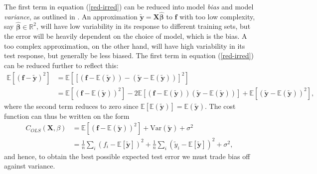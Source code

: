 \documentclass[]{article}
\begin{document}
The first term in equation (\ref{red-irred}) can be reduced into model \textit{bias} and model \textit{variance}, as outlined in \cite{friedman2001elements}. An approximation $\mathbf{\tilde{y}} = \mathbf{X\hat{\beta}}$ to $\mathbf{f}$ with too low complexity, say $\mathbf{\hat{\beta}} \in \mathbb{R}^2$, will have low variability in its response to different training sets, but the error will be heavily dependent on the choice of model, which is the bias. A too complex approximation, on the other hand, will have high variability in its test response, but generally be less biased. The first term in equation (\ref{red-irred}) can be reduced further to reflect this:
\begin{equation}
\begin{aligned}
\mathbb{E}[(\mathbf{f} - \mathbf{\tilde{y}})^2] &= \mathbb{E}[[(\mathbf{f} - \mathbb{E}(\mathbf{\tilde{y}})) - (\mathbf{\tilde{y}}- \mathbb{E}(\mathbf{\tilde{y}}))]^2] \\ 
&= \mathbb{E}[(\mathbf{f} - \mathbb{E}(\mathbf{\tilde{y}}))^2] - 2\mathbb{E}[(\mathbf{f} - \mathbb{E}(\mathbf{\tilde{y}}))(\mathbf{\tilde{y}}- \mathbb{E}(\mathbf{\tilde{y}}))] + \mathbb{E}[(\mathbf{\tilde{y}}- \mathbb{E}(\mathbf{\tilde{y}}))^2],
\end{aligned}
\end{equation}
where the second term reduces to zero since $\mathbb{E}[\mathbb{E}(\mathbf{\tilde{y}})] = \mathbb{E}(\mathbf{\tilde{y}})$. The cost function can thus be written on the form
\begin{equation}
\begin{aligned}
\label{bias-variance}
C_{OLS}(\mathbf{X},\mathbb{\beta}) &= \mathbb{E}[(\mathbf{f} - \mathbb{E}(\mathbf{\tilde{y}}))^2] + \mathrm{Var}(\mathbf{\tilde{y}}) + \sigma^2 \\
&=\frac{1}{n}\sum_i(f_i-\mathbb{E}\left[\boldsymbol{\tilde{y}}\right])^2+\frac{1}{n}\sum_i(\tilde{y}_i-\mathbb{E}\left[\boldsymbol{\tilde{y}}\right])^2+\sigma^2,
\end{aligned}
\end{equation}
and hence, to obtain the best possible expected test error we must trade bias off against variance.
\end{document}
